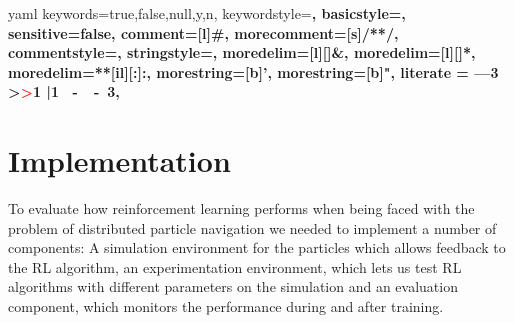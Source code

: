 
\newcommand\YAMLcolonstyle{\color{black}\bfseries\small}
\newcommand\YAMLkeystyle{\color{black}\mdseries\small}
\newcommand\YAMLvaluestyle{\color{green}\mdseries\small}

\makeatletter

\newcommand\language@yaml{yaml}

\expandafter\expandafter\expandafter\lstdefinelanguage
\expandafter{\language@yaml}
{
  keywords={true,false,null,y,n},
  keywordstyle=\color{darkgray}\bfseries,
  basicstyle=\YAMLkeystyle,                                 %
  sensitive=false,
  comment=[l]{\#},
  morecomment=[s]{/*}{*/},
  commentstyle=\color{purple}\ttfamily,
  stringstyle=\YAMLvaluestyle\ttfamily,
  moredelim=[l][\color{orange}]{\&},
  moredelim=[l][\color{magenta}]{*},
  moredelim=**[il][\YAMLcolonstyle{:}\YAMLvaluestyle]{:},   %
  morestring=[b]',
  morestring=[b]",
  literate =    {---}{{\ProcessThreeDashes}}3
                {>}{{\textcolor{red}\textgreater}}1     
                {|}{{\textcolor{red}\textbar}}1 
                {\ -\ }{{\mdseries\ -\ }}3,
}

\lst@AddToHook{EveryLine}{\ifx\lst@language\language@yaml\YAMLkeystyle\fi}
\makeatother

\newcommand\ProcessThreeDashes{\llap{\color{cyan}\mdseries-{-}-}}




\lstset{style=mystyle}

\chapter{Implementation} \label{chp:Implementation}
To evaluate how reinforcement learning performs when being faced with the problem of distributed particle navigation we needed to implement a number of components: A simulation environment for the particles which allows feedback to the RL algorithm, an experimentation environment, which lets us test RL algorithms with different parameters on the simulation and an evaluation component, which monitors the performance during and after training.

